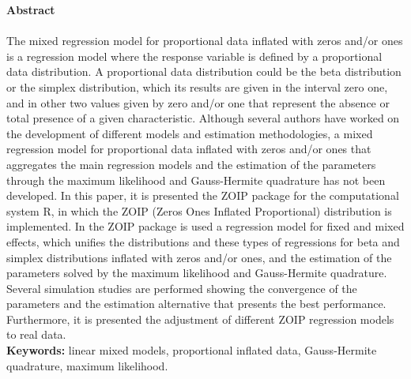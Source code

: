 \textbf{\LARGE Abstract}\\\\
The mixed regression model for proportional data inflated with zeros and/or ones is a regression model where the response variable is defined by a proportional data distribution. A proportional data distribution could be the beta distribution or the simplex distribution, which its results are given in the interval zero one, and in other two values given by zero and/or one that represent the absence or total presence of a given characteristic. Although several authors have worked on the development of different models and estimation me\-tho\-do\-lo\-gies, a mixed regression model for proportional data inflated with zeros and/or ones that aggregates the main regression models and the estimation of the parameters through the maximum likelihood and Gauss-Hermite quadrature has not been developed. In this paper, it is presented the ZOIP package for the computational system R, in which the ZOIP (Zeros Ones Inflated Proportional) distribution is implemented. In the ZOIP package is used a regression model for fixed and mixed effects, which unifies the distributions and these types of regressions for beta and simplex distributions inflated with zeros and/or ones, and the estimation of the parameters solved by the maximum likelihood and Gauss-Hermite quadrature. Several simulation studies are performed showing the convergence of the parameters and the estimation alternative that presents the best performance. Furthermore, it is presented the adjustment of different ZOIP regression models to real data.\\

\textbf{\small Keywords:} linear mixed models, proportional inflated data, Gauss-Hermite quadrature, maximum likelihood.\\